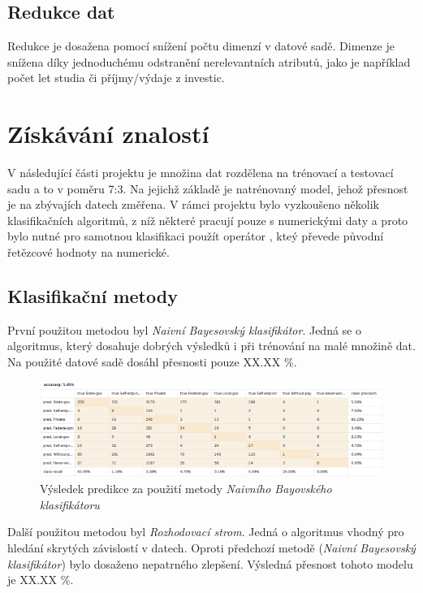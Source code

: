 \documentclass[11pt,a4paper,titlepage]{article}
\begin{document}
        \subsection{Redukce dat}
            Redukce je dosažena pomocí snížení počtu dimenzí v datové sadě. Dimenze je snížena díky jednoduchému odstranění nerelevantních atributů, jako je například
            počet let studia či příjmy/výdaje z investic.
    
    \section{Získávání znalostí}
        V následující části projektu je množina dat rozdělena na trénovací a testovací sadu a to v poměru 7:3. Na jejichž základě je natrénovaný model, jehož přesnost je na zbývajích datech změřena. V rámci projektu bylo vyzkoušeno několik klasifikačních algoritmů, z níž některé pracují pouze s numerickými daty a proto bylo nutné pro samotnou klasifikaci použít operátor , kteý převede původní řetězcové hodnoty na numerické.

        \subsection{Klasifikační metody}
            První použitou metodou byl \textit{Naivní Bayesovský klasifikátor}. Jedná se o algoritmus, který dosahuje dobrých výsledků i při trénování na malé množině dat. Na použité datové sadě dosáhl přesnosti pouze XX.XX \%.
            
            \begin{figure}[H]
                \centering
                \includegraphics{./img/presnost_bayes.png}
                \caption{Výsledek predikce za použití metody \textit{Naivního Bayovského klasifikátoru}}
            \end{figure}

            Další použitou metodou byl \textit{Rozhodovací strom}. Jedná o algoritmus vhodný pro hledání skrytých závislostí v datech. Oproti předchozí metodě (\textit{Naivní Bayesovský klasifikátor}) bylo dosaženo nepatrného zlepšení. Výsledná přesnost tohoto modelu je XX.XX \%.
            
\end{document}
